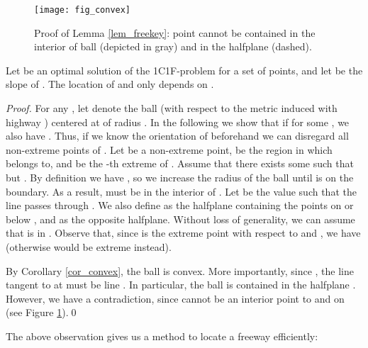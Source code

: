 \documentclass{llncs}
\begin{document}
\begin{figure}[h]
    \centering
    \texttt{[image: fig\_convex]}
    \caption{Proof of Lemma \ref{lem_freekey}: point  cannot be contained in the interior of ball  (depicted in gray) and in the halfplane  (dashed).}
    \label{fig_convex}
\end{figure}
\begin{lemma}\label{lem_freekey}
Let  be an optimal solution of the 1C1F-problem for a set  of points, and let  be the slope of . The location of  and  only depends on .
\end{lemma}
\begin{proof}
For any , let  denote the ball (with respect to the metric induced with highway ) centered at  of radius . In the following we show that if  for some , we also have . Thus, if we know the orientation of  beforehand we can disregard all non-extreme points of .
Let  be a non-extreme point,  be the region in which  belongs to, and  be the -th extreme of . Assume that there exists some  such that  but . By definition we have , so we increase the radius of the ball until  is on the boundary. As a result,  must be in the interior of . Let  be the value such that the line  passes through . We also define  as the halfplane containing the points on or below , and  as the opposite halfplane. Without loss of generality, we can assume that  is in . Observe that, since  is the extreme point with respect to  and , we have  (otherwise  would be extreme instead).

By Corollary \ref{cor_convex}, the ball  is convex. More importantly, since , the line tangent to  at  must be  line . In particular, the ball  is contained in the halfplane . However, we have a contradiction, since  cannot be an interior point to  and on  (see Figure \ref{fig_convex}).\qed
\end{proof}

The above observation gives us a method to locate a freeway efficiently:
\end{document}
